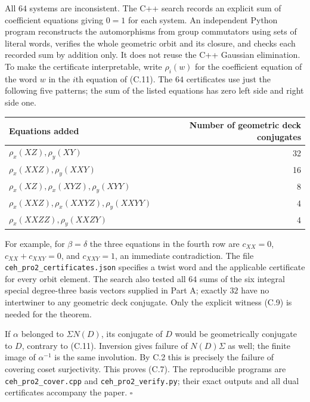 \documentclass[10pt,a4paper]{article}
\begin{document}
All \(64\) systems are inconsistent. The C++ search records an explicit sum of coefficient equations giving \(0=1\) for each system. An independent Python program reconstructs the automorphisms from group commutators using sets of literal words, verifies the whole geometric orbit and its closure, and checks each recorded sum by addition only. It does not reuse the C++ Gaussian elimination. To make the certificate interpretable, write \(\rho_i(w)\) for the coefficient equation of the word \(w\) in the \(i\)th equation of (C.11). The \(64\) certificates use just the following five patterns; the sum of the listed equations has zero left side and right side one.

\begin{longtable}[]{@{}lr@{}}
\toprule\noalign{}
Equations added & Number of geometric deck conjugates \\
\midrule\noalign{}
\endhead
\bottomrule\noalign{}
\endlastfoot
\(\rho_x(XZ),\rho_y(XY)\) & 32 \\
\(\rho_x(XXZ),\rho_y(XXY)\) & 16 \\
\(\rho_x(XZ),\rho_x(XYZ),\rho_y(XYY)\) & 8 \\
\(\rho_x(XXZ),\rho_x(XXYZ),\rho_y(XXYY)\) & 4 \\
\(\rho_x(XXZZ),\rho_y(XXZY)\) & 4 \\
\end{longtable}

For example, for \(\beta=\delta\) the three equations in the fourth row are \(c_{XX}=0\), \(c_{XX}+c_{XXY}=0\), and \(c_{XXY}=1\), an immediate contradiction. The file \texttt{ceh\_pro2\_certificates.json} specifies a twist word and the applicable certificate for every orbit element. The search also tested all \(64\) sums of the six integral special degree-three basis vectors supplied in Part A; exactly \(32\) have no intertwiner to any geometric deck conjugate. Only the explicit witness (C.9) is needed for the theorem.

If \(\alpha\) belonged to \(\Sigma N(D)\), its conjugate of \(D\) would be geometrically conjugate to \(D\), contrary to (C.11). Inversion gives failure of \(N(D)\Sigma\) as well; the finite image of \(\alpha^{-1}\) is the same involution. By C.2 this is precisely the failure of covering coset surjectivity. This proves (C.7). The reproducible programs are \texttt{ceh\_pro2\_cover.cpp} and \texttt{ceh\_pro2\_verify.py}; their exact outputs and all dual certificates accompany the paper. \(\square\)

\end{document}
